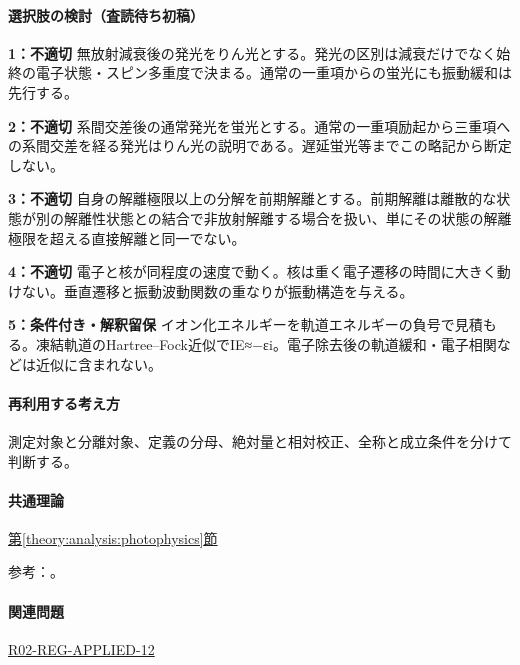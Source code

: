\paragraph{選択肢の検討（査読待ち初稿）}\mbox{}\par

\noindent\textbf{1：不適切} 無放射減衰後の発光をりん光とする。発光の区別は減衰だけでなく始終の電子状態・スピン多重度で決まる。通常の一重項からの蛍光にも振動緩和は先行する。\par

\noindent\textbf{2：不適切} 系間交差後の通常発光を蛍光とする。通常の一重項励起から三重項への系間交差を経る発光はりん光の説明である。遅延蛍光等までこの略記から断定しない。\par

\noindent\textbf{3：不適切} 自身の解離極限以上の分解を前期解離とする。前期解離は離散的な状態が別の解離性状態との結合で非放射解離する場合を扱い、単にその状態の解離極限を超える直接解離と同一でない。\par

\noindent\textbf{4：不適切} 電子と核が同程度の速度で動く。核は重く電子遷移の時間に大きく動けない。垂直遷移と振動波動関数の重なりが振動構造を与える。\par

\noindent\textbf{5：条件付き・解釈留保} イオン化エネルギーを軌道エネルギーの負号で見積もる。凍結軌道のHartree–Fock近似でIE≈−εi。電子除去後の軌道緩和・電子相関などは近似に含まれない。\par

\paragraph{再利用する考え方} 測定対象と分離対象、定義の分母、絶対量と相対校正、全称と成立条件を分けて判断する。

\paragraph{共通理論} \hyperref[theory:analysis:photophysics]{第\ref*{theory:analysis:photophysics}節}

\par 参考：\cite{analysis49_koop_ref,analysis49_pred_ref,atomic_ir_raman}。

\paragraph{関連問題} \hyperref[q:r02-reg-applied-12]{R02-REG-APPLIED-12}


